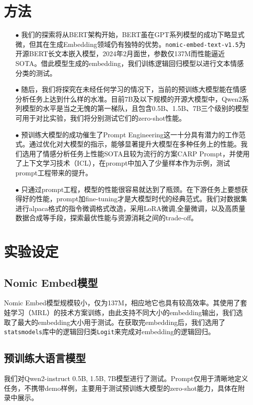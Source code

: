 \documentclass{article}
\begin{document}
\section{方法}
\begin{itemize}
  \item[$\bullet$] 我们的探索将从BERT架构开始，BERT虽在GPT系列模型的成功下略显式微，但其在生成Embedding领域仍有独特的优势。\verb|nomic-embed-text-v1.5|\cite{nomic}为开源BERT长文本嵌入模型，2024年2月面世，参数仅137M而性能逼近SOTA。借此模型生成的embedding，我们训练逻辑回归模型以进行文本情感分类的测试。
  \item[$\bullet$] 随后，我们将探究在未经任何学习的情况下，当前的预训练大模型能在情感分析任务上达到什么样的水准。目前7B及以下规模的开源大模型中，Qwen2\cite{qwen}系列模型的水平是当之无愧的第一梯队，且包含0.5B、1.5B、7B三个级别的模型可用于对比实验，我们将分别测试它们的zero-shot性能。
  \item[$\bullet$] 预训练大模型的成功催生了Prompt Engineering这一十分具有潜力的工作范式。通过优化对大模型的指示，能够显著提升大模型在多种任务上的性能。我们选用了情感分析任务上性能SOTA且较为流行的方案CARP Prompt\cite{CARP}，并使用了上下文学习技术（ICL），在prompt中加入了少量样本作为示例，测试prompt工程带来的提升。
  \item[$\bullet$] 只通过prompt工程，模型的性能很容易就达到了瓶颈。在下游任务上要想获得好的性能，prompt加fine-tuning才是大模型时代的经典范式。我们对数据集进行alpaca格式的指令微调格式改造，采用LoRA微调\cite{hu2021lora},全量微调，以及高质量数据合成等手段，探索最优性能与资源消耗之间的trade-off。
\end{itemize}





\section{实验设定}
\subsection{Nomic Embed模型}
Nomic Embed模型规模较小，仅为137M，相应地它也具有较高效率。其使用了套娃学习（MRL）\cite{matryoshka}的技术方案训练，由此支持不同大小的embedding输出，我们选取了最大的embedding大小用于测试。在获取完embedding后，我们选用了\verb|statsmodels|库中的逻辑回归类\verb|Logit|来完成对embedding的逻辑回归。

\subsection{预训练大语言模型}
我们对Qwen2-instruct 0.5B, 1.5B, 7B模型进行了测试。Prompt仅用于清晰地定义任务，不携带demo样例，主要用于测试预训练大模型的zero-shot能力，具体在附录中展示。
\end{document}
